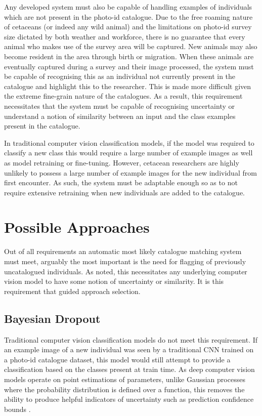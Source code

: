 Any developed system must also be capable of handling examples of individuals which are not present in the photo-id catalogue. Due to the free roaming nature of cetaceans (or indeed any wild animal) and the limitations on photo-id survey size dictated by both weather and workforce, there is no guarantee that every animal who makes use of the survey area will be captured. New animals may also become resident in the area through birth or migration. When these animals are eventually captured during a survey and their image processed, the system must be capable of recognising this as an individual not currently present in the catalogue and highlight this to the researcher. This is made more difficult given the extreme fine-grain nature of the catalogues. As a result, this requirement necessitates that the system must be capable of recognising uncertainty or understand a notion of similarity between an input and the class examples present in the catalogue. 

In traditional computer vision classification models, if the model was required to classify a new class this would require a large number of example images as well as model retraining or fine-tuning. However, cetacean researchers are highly unlikely to possess a large number of example images for the new individual from first encounter. As such, the system must be adaptable enough so as to not require extensive retraining when new individuals are added to the catalogue.

\section{Possible Approaches}\label{ch:ID,sec:deciding}

Out of all requirements an automatic most likely catalogue matching system must meet, arguably the most important is the need for flagging of previously uncatalogued individuals. As noted, this necessitates any underlying computer vision model to have some notion of uncertainty or similarity. It is this requirement that guided approach selection. 

\subsection{Bayesian Dropout}\label{ch:ID,sec:deciding,sub:bayesianDropout}

Traditional computer vision classification models do not meet this requirement. If an example image of a new individual was seen by a traditional CNN trained on a photo-id catalogue dataset, this model would still attempt to provide a classification based on the classes present at train time.  As deep computer vision models operate on point estimations of parameters, unlike Gaussian processes where the probability distribution is defined over a function, this removes the ability to produce helpful indicators of uncertainty such as prediction confidence bounds \cite{gal_uncertainty_2016}. 

